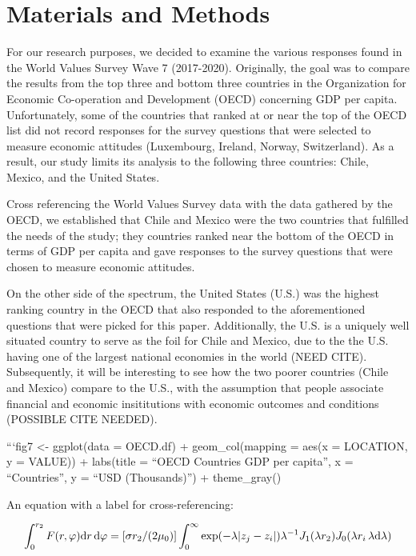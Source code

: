 \documentclass[12pt,halfline,a4paper,]{ouparticle}
\begin{document}
\hypertarget{materials-and-methods}{%
\section{Materials and Methods}\label{materials-and-methods}}

For our research purposes, we decided to examine the various responses
found in the World Values Survey Wave 7 (2017-2020). Originally, the
goal was to compare the results from the top three and bottom three
countries in the Organization for Economic Co-operation and Development
(OECD) concerning GDP per capita. Unfortunately, some of the countries
that ranked at or near the top of the OECD list did not record responses
for the survey questions that were selected to measure economic
attitudes (Luxembourg, Ireland, Norway, Switzerland). As a result, our
study limits its analysis to the following three countries: Chile,
Mexico, and the United States.

Cross referencing the World Values Survey data with the data gathered by
the OECD, we established that Chile and Mexico were the two countries
that fulfilled the needs of the study; they countries ranked near the
bottom of the OECD in terms of GDP per capita and gave responses to the
survey questions that were chosen to measure economic attitudes.

On the other side of the spectrum, the United States (U.S.) was the
highest ranking country in the OECD that also responded to the
aforementioned questions that were picked for this paper. Additionally,
the U.S. is a uniquely well situated country to serve as the foil for
Chile and Mexico, due to the the U.S. having one of the largest national
economies in the world (NEED CITE). Subsequently, it will be interesting
to see how the two poorer countries (Chile and Mexico) compare to the
U.S., with the assumption that people associate financial and economic
insititutions with economic outcomes and conditions (POSSIBLE CITE
NEEDED).

```fig7 \textless- ggplot(data = OECD.df) + geom\_col(mapping = aes(x =
LOCATION, y = VALUE)) + labs(title = ``OECD Countries GDP per capita'',
x = ``Countries'', y = ``USD (Thousands)'') + theme\_gray()

An equation with a label for cross-referencing:

\begin{equation}\label{eq:eq1}
\int^{r_2}_0 F(r,\varphi){\rm d}r\,{\rm d}\varphi = [\sigma r_2/(2\mu_0)]
\int^{\infty}_0\exp(-\lambda|z_j-z_i|)\lambda^{-1}J_1 (\lambda r_2)J_0
(\lambda r_i\,\lambda {\rm d}\lambda)
\end{equation}
\end{document}
